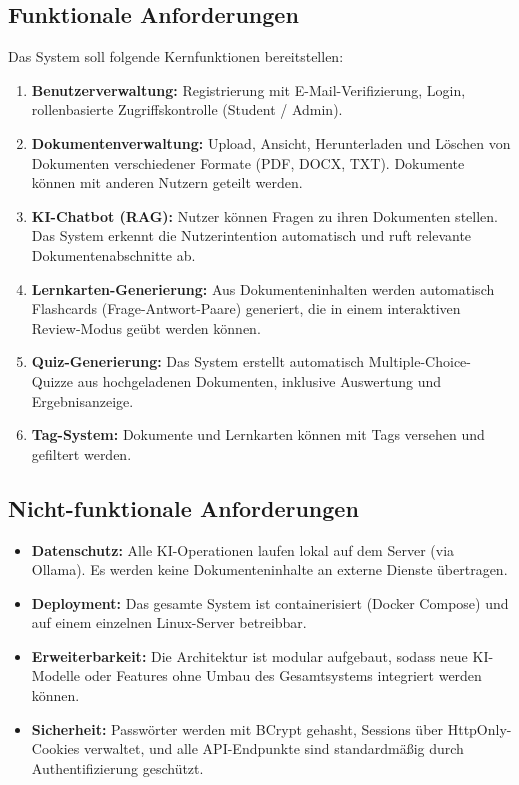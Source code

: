 \subsection{Funktionale Anforderungen}

Das System soll folgende Kernfunktionen bereitstellen:

\begin{enumerate}
    \item \textbf{Benutzerverwaltung:} Registrierung mit E-Mail-Verifizierung, Login, rollenbasierte Zugriffskontrolle (Student / Admin).
    \item \textbf{Dokumentenverwaltung:} Upload, Ansicht, Herunterladen und Löschen von Dokumenten verschiedener Formate (PDF, DOCX, TXT). Dokumente können mit anderen Nutzern geteilt werden.
    \item \textbf{KI-Chatbot (RAG):} Nutzer können Fragen zu ihren Dokumenten stellen. Das System erkennt die Nutzerintention automatisch und ruft relevante Dokumentenabschnitte ab.
    \item \textbf{Lernkarten-Generierung:} Aus Dokumenteninhalten werden automatisch Flashcards (Frage-Antwort-Paare) generiert, die in einem interaktiven Review-Modus geübt werden können.
    \item \textbf{Quiz-Generierung:} Das System erstellt automatisch Multiple-Choice-Quizze aus hochgeladenen Dokumenten, inklusive Auswertung und Ergebnisanzeige.
    \item \textbf{Tag-System:} Dokumente und Lernkarten können mit Tags versehen und gefiltert werden.
\end{enumerate}

\subsection{Nicht-funktionale Anforderungen}

\begin{itemize}
    \item \textbf{Datenschutz:} Alle KI-Operationen laufen lokal auf dem Server (via Ollama). Es werden keine Dokumenteninhalte an externe Dienste übertragen.
    \item \textbf{Deployment:} Das gesamte System ist containerisiert (Docker Compose) und auf einem einzelnen Linux-Server betreibbar.
    \item \textbf{Erweiterbarkeit:} Die Architektur ist modular aufgebaut, sodass neue KI-Modelle oder Features ohne Umbau des Gesamtsystems integriert werden können.
    \item \textbf{Sicherheit:} Passwörter werden mit BCrypt gehasht, Sessions über HttpOnly-Cookies verwaltet, und alle API-Endpunkte sind standardmäßig durch Authentifizierung geschützt.
\end{itemize}


